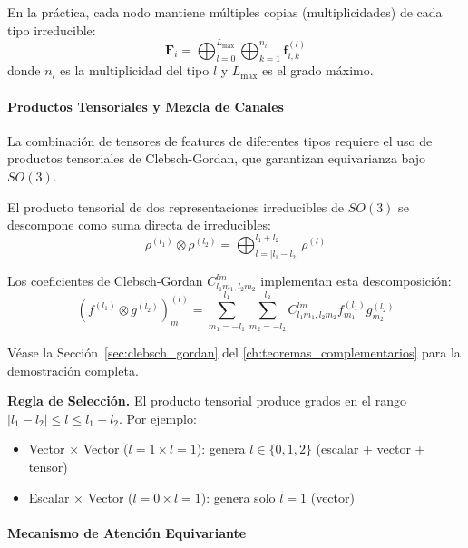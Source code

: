 En la práctica, cada nodo mantiene múltiples copias (multiplicidades) de cada tipo irreducible:
\begin{equation}
\mathbf{F}_i = \bigoplus_{l=0}^{L_{\max}} \bigoplus_{k=1}^{n_l} \mathbf{f}_{i,k}^{(l)}
\end{equation}
donde $n_l$ es la multiplicidad del tipo $l$ y $L_{\max}$ es el grado máximo.

\paragraph{Productos Tensoriales y Mezcla de Canales}

La combinación de tensores de features de diferentes tipos requiere el uso de productos tensoriales de Clebsch-Gordan, que garantizan equivarianza bajo $SO(3)$.

\begin{theorem}\label{thm:clebsch_gordan}
El producto tensorial de dos representaciones irreducibles de $SO(3)$ se descompone como suma directa de irreducibles:
\begin{equation}
\rho^{(l_1)} \otimes \rho^{(l_2)} = \bigoplus_{l=|l_1-l_2|}^{l_1+l_2} \rho^{(l)}
\end{equation}

Los coeficientes de Clebsch-Gordan $C_{l_1 m_1, l_2 m_2}^{l m}$ implementan esta descomposición:
\begin{equation}
(f^{(l_1)} \otimes g^{(l_2)})^{(l)}_m = \sum_{m_1=-l_1}^{l_1} \sum_{m_2=-l_2}^{l_2} C_{l_1 m_1, l_2 m_2}^{l m} f^{(l_1)}_{m_1} g^{(l_2)}_{m_2}
\end{equation}

Véase la Sección~\ref{sec:clebsch_gordan} del \autoref{ch:teoremas_complementarios} para la demostración completa.
\end{theorem}

\textbf{Regla de Selección.} El producto tensorial produce grados en el rango $|l_1 - l_2| \leq l \leq l_1 + l_2$. Por ejemplo:
\begin{itemize}
    \item Vector $\times$ Vector ($l=1 \times l=1$): genera $l \in \{0, 1, 2\}$ (escalar + vector + tensor)
    \item Escalar $\times$ Vector ($l=0 \times l=1$): genera solo $l=1$ (vector)
\end{itemize}

\paragraph{Mecanismo de Atención Equivariante}

